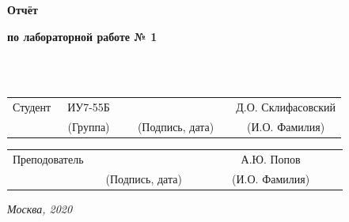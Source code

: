 \documentclass[12pt]{report}
\begin{document}
\begin{titlepage}
		
		\begin{center}
			\vspace{3cm}
			{\bf\huge Отчёт\par}
			{\bf\Large по лабораторной работе № 1\par}
			\vspace{0.5cm}
		\end{center}
		
		
		\noindent
		\\
		
		\noindent
		\\
		
		\vspace{1.5cm}
		\noindent
		\begin{tabular}{l c c c c c}
			Студент      & ~ИУ7-55Б~               & \hspace{3.5cm} & \hspace{3.5cm}                 & &  Д.О. Склифасовский \\\cline{2-2}\cline{4-4} \cline{6-6} 
			\hspace{3cm} & {\footnotesize(Группа)} &                & {\footnotesize(Подпись, дата)} & & {\footnotesize(И.О. Фамилия)}
		\end{tabular}
		
		\vspace{1cm}
		
		\noindent
		\begin{tabular}{l c c c c}
			Преподователь & \hspace{6cm}   & \hspace{3.5cm}                 & & ~~~~~~ А.Ю. Попов ~~~~~~\\\cline{3-3} \cline{5-5} 
			\hspace{3cm}  &                & {\footnotesize(Подпись, дата)} & & {\footnotesize(И.О. Фамилия)}
		\end{tabular}
		
		\begin{center}	
			\vfill
			\large \textit {Москва, 2020}
		\end{center}
		
		\thispagestyle {empty}
		\pagebreak
	\end{titlepage}
	\restoregeometry
	
	\onehalfspacing
	\tableofcontents
	
\end{document}
